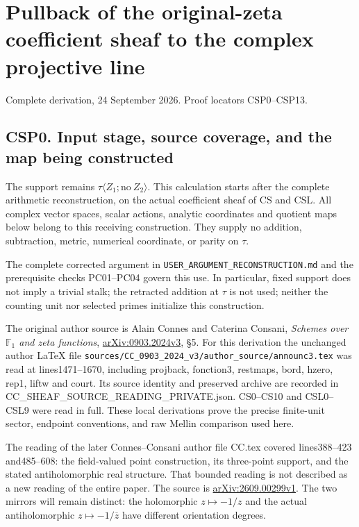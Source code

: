 \section{Pullback of the original-zeta coefficient sheaf to the complex
projective
line}\label{pullback-of-the-original-zeta-coefficient-sheaf-to-the-complex-projective-line}

Complete derivation, 24 September 2026. Proof locators CSP0--CSP13.

\subsection{CSP0. Input stage, source coverage, and the map being
constructed}\label{csp0.-input-stage-source-coverage-and-the-map-being-constructed}

The support remains \(\tau\langle Z_1;\mathrm{no}\ Z_2\rangle\). This
calculation starts after the complete arithmetic reconstruction, on the
actual coefficient sheaf of CS and CSL. All complex vector spaces,
scalar actions, analytic coordinates and quotient maps below belong to
this receiving construction. They supply no addition, subtraction,
metric, numerical coordinate, or parity on \(\tau\).

The complete corrected argument in
\nolinkurl{USER_ARGUMENT_RECONSTRUCTION.md} and the prerequisite checks
PC01--PC04 govern this use. In particular, fixed support does not imply
a trivial stalk; the retracted addition at \(\tau\) is not used; neither
the counting unit nor selected primes initialize this construction.

The original author source is Alain Connes and Caterina Consani,
\emph{Schemes over \(\mathbb F_1\) and zeta functions},
\href{https://arxiv.org/abs/0903.2024v3}{arXiv:0903.2024v3}, §5. For
this derivation the unchanged author LaTeX file
\nolinkurl{sources/CC_0903_2024_v3/author_source/announc3.tex} was read
at lines1471--1670, including projback, fonction3, restmaps, bord,
hzero, rep1, liftw and court. Its source identity and preserved archive
are recorded in CC\_SHEAF\_SOURCE\_READING\_PRIVATE.json. CS0--CS10 and
CSL0--CSL9 were read in full. These local derivations prove the precise
finite-unit sector, endpoint conventions, and raw Mellin comparison used
here.

The reading of the later Connes--Consani author file CC.tex covered
lines388--423 and485--608: the field-valued point construction, its
three-point support, and the stated antiholomorphic real structure. That
bounded reading is not described as a new reading of the entire paper.
The source is
\href{https://arxiv.org/abs/2609.00299v1}{arXiv:2609.00299v1}. The two
mirrors will remain distinct: the holomorphic \(z\mapsto-1/z\) and the
actual antiholomorphic \(z\mapsto-1/\overline z\) have different
orientation degrees.

